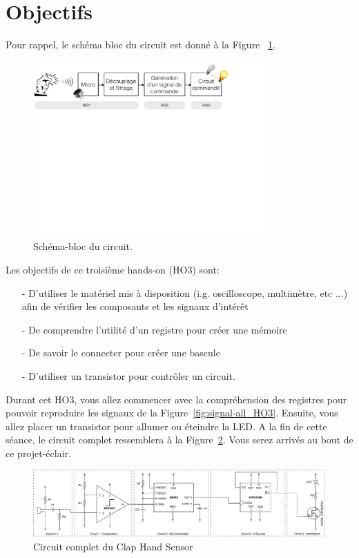 \section{Objectifs}

Pour rappel, le schéma bloc du circuit est donné à la Figure ~\ref{fig:block-diagram}.

\begin{figure}[!ht]
	\centering
	\includegraphics[width=0.8\textwidth]{figures/SchemaBloc.pdf}
	\caption{Schéma-bloc du circuit.}
	\label{fig:block-diagram}
\end{figure}

\vspace{1cm}

Les objectifs de ce troisième hands-on (HO3) sont:

\begin{itemize}
    \item[-] D'utiliser le matériel mis à disposition (i.g. oscilloscope, multimètre, etc ...) afin de vérifier les composants et les signaux d'intérêt
	\item[-] De comprendre l'utilité d'un registre pour créer une mémoire
	\item[-] De savoir le connecter pour créer une bascule
    \item[-] D'utiliser un transistor pour contrôler un circuit.
\end{itemize}

Durant cet HO3, vous allez commencer avec la compréhension des registres pour pouvoir reproduire les signaux de la Figure~\ref{fig:signal-all_HO3}. Ensuite, vous allez placer un transistor pour allumer ou éteindre la LED. A la fin de cette séance, le circuit complet ressemblera à la Figure~\ref{fig:all}. Vous serez arrivés au bout de ce projet-éclair. 
\vspace{1.5cm}

\begin{figure}[h!]
    \centering
    \includegraphics[width=1\textwidth]{HO3_complete.pdf}
    \caption{Circuit complet du Clap Hand Sensor}
    \label{fig:all}
\end{figure}